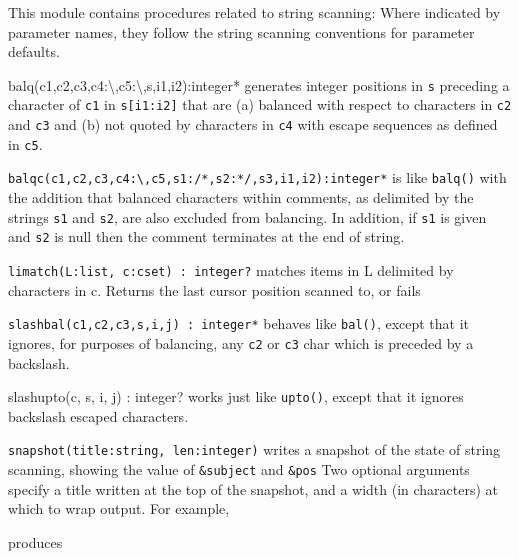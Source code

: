 This module contains procedures related to string
scanning: Where indicated by parameter names, they follow the string
scanning conventions for parameter defaults.

\textsf{balq(c1,c2,c3,c4:{\textquotesingle}{\textbackslash}{\textquotesingle}{\textquotedbl}{\textquotesingle},c5:{\textquotesingle}{\textbackslash}{\textquotesingle},s,i1,i2):integer*}
generates integer positions in \texttt{s} preceding a character of
\texttt{c1} in \texttt{s[i1:i2]} that are (a) balanced with respect to
characters in \texttt{c2} and \texttt{c3} and (b) not
{\textquotedbl}quoted{\textquotedbl} by characters in \texttt{c4} with
{\textquotedbl}escape{\textquotedbl} sequences as defined in
\texttt{c5}.

\texttt{balqc(c1,c2,c3,c4:{\textquotesingle}{\textbackslash}{\textquotesingle}{\textquotedbl}{\textquotesingle},c5,s1:{\textquotedbl}/*{\textquotedbl},s2:{\textquotedbl}*/{\textquotedbl},s3,i1,i2):integer*}
is like \texttt{balq()} with the addition that balanced characters
within {\textquotedbl}comments{\textquotedbl}, as delimited by the
strings \texttt{s1} and \texttt{s2}, are also excluded from balancing.
In addition, if \texttt{s1} is given and \texttt{s2} is null then the
comment terminates at the end of string.

\texttt{limatch(L:list, c:cset) : integer?} matches items in L delimited
by characters in c. Returns the last cursor position scanned to, or
fails 

\texttt{slashbal(c1,c2,c3,s,i,j) : integer*} behaves like
\texttt{bal()}, except that it ignores, for purposes of balancing, any
\texttt{c2} or \texttt{c3} char which is preceded by a backslash.

\textsf{slashupto(c, s, i, j) : integer?} works just like
\texttt{upto()}, except that it ignores backslash escaped characters.

\texttt{snapshot(title:string, len:integer)} writes a snapshot of the
state of string scanning, showing the value of \texttt{\&subject} and
\texttt{\&pos} Two optional arguments specify a title written at the
top of the snapshot, and a width (in characters) at which to wrap
output. For example,


produces


